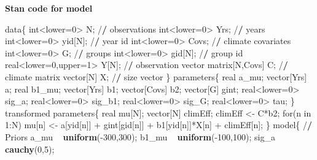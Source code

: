 \documentclass[12pt,]{article}
\newenvironment{Shaded}{\begin{snugshade}}{\end{snugshade}}
\newcommand{\KeywordTok}[1]{\textcolor[rgb]{0.13,0.29,0.53}{\textbf{{#1}}}}
\newcommand{\DecValTok}[1]{\textcolor[rgb]{0.00,0.00,0.81}{{#1}}}
\newcommand{\StringTok}[1]{\textcolor[rgb]{0.31,0.60,0.02}{{#1}}}
\newcommand{\ErrorTok}[1]{\textbf{{#1}}}
\newcommand{\NormalTok}[1]{{#1}}
\begin{document}
\textbf{Stan code for model}

\begin{Shaded}
\begin{Highlighting}[]
\NormalTok{data\{}
  \NormalTok{int<lower=}\DecValTok{0}\NormalTok{>}\StringTok{ }\NormalTok{N; /}\ErrorTok{/}\StringTok{ }\NormalTok{observations}
  \NormalTok{int<lower=}\DecValTok{0}\NormalTok{>}\StringTok{ }\NormalTok{Yrs; /}\ErrorTok{/}\StringTok{ }\NormalTok{years}
  \NormalTok{int<lower=}\DecValTok{0}\NormalTok{>}\StringTok{ }\NormalTok{yid[N]; /}\ErrorTok{/}\StringTok{ }\NormalTok{year id}
  \NormalTok{int<lower=}\DecValTok{0}\NormalTok{>}\StringTok{ }\NormalTok{Covs; /}\ErrorTok{/}\StringTok{ }\NormalTok{climate covariates}
  \NormalTok{int<lower=}\DecValTok{0}\NormalTok{>}\StringTok{ }\NormalTok{G; /}\ErrorTok{/}\StringTok{ }\NormalTok{groups}
  \NormalTok{int<lower=}\DecValTok{0}\NormalTok{>}\StringTok{ }\NormalTok{gid[N]; /}\ErrorTok{/}\StringTok{ }\NormalTok{group id}
  \NormalTok{real<lower=}\DecValTok{0}\NormalTok{,upper=}\DecValTok{1}\NormalTok{>}\StringTok{ }\NormalTok{Y[N]; /}\ErrorTok{/}\StringTok{ }\NormalTok{observation vector}
  \NormalTok{matrix[N,Covs] C; /}\ErrorTok{/}\StringTok{ }\NormalTok{climate matrix}
  \NormalTok{vector[N] X; /}\ErrorTok{/}\StringTok{ }\NormalTok{size vector}
\NormalTok{\}}
\NormalTok{parameters\{}
  \NormalTok{real a_mu;}
  \NormalTok{vector[Yrs] a;}
  \NormalTok{real b1_mu;}
  \NormalTok{vector[Yrs] b1;}
  \NormalTok{vector[Covs] b2;}
  \NormalTok{vector[G] gint;}
  \NormalTok{real<lower=}\DecValTok{0}\NormalTok{>}\StringTok{ }\NormalTok{sig_a;}
  \NormalTok{real<lower=}\DecValTok{0}\NormalTok{>}\StringTok{ }\NormalTok{sig_b1;}
  \NormalTok{real<lower=}\DecValTok{0}\NormalTok{>}\StringTok{ }\NormalTok{sig_G;}
  \NormalTok{real<lower=}\DecValTok{0}\NormalTok{>}\StringTok{ }\NormalTok{tau;}
\NormalTok{\}}
\NormalTok{transformed parameters\{}
  \NormalTok{real mu[N];}
  \NormalTok{vector[N] climEff;}
  \NormalTok{climEff <-}\StringTok{ }\NormalTok{C*b2;}
  \NormalTok{for(n in }\DecValTok{1}\NormalTok{:N)}
    \NormalTok{mu[n] <-}\StringTok{ }\NormalTok{a[yid[n]] +}\StringTok{ }\NormalTok{gint[gid[n]] +}\StringTok{ }\NormalTok{b1[yid[n]]*X[n] +}\StringTok{ }\NormalTok{climEff[n];}
\NormalTok{\}}
\NormalTok{model\{}
  \NormalTok{/}\ErrorTok{/}\StringTok{ }\NormalTok{Priors}
  \NormalTok{a_mu ~}\StringTok{ }\KeywordTok{uniform}\NormalTok{(-}\DecValTok{300}\NormalTok{,}\DecValTok{300}\NormalTok{);}
  \NormalTok{b1_mu ~}\StringTok{ }\KeywordTok{uniform}\NormalTok{(-}\DecValTok{100}\NormalTok{,}\DecValTok{100}\NormalTok{);}
  \NormalTok{sig_a ~}\StringTok{ }\KeywordTok{cauchy}\NormalTok{(}\DecValTok{0}\NormalTok{,}\DecValTok{5}\NormalTok{);}

\end{Highlighting}
\end{Shaded}
\end{document}
